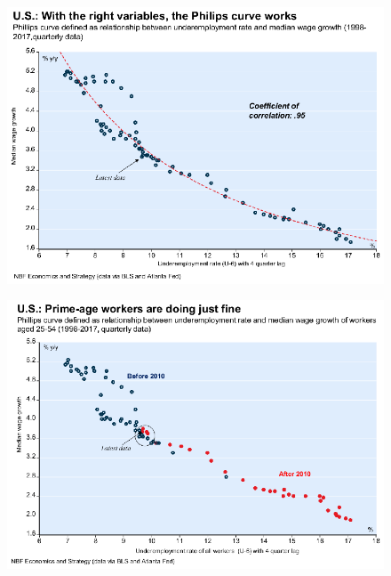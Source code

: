 \documentclass{beamer}
\begin{document}
\begin{frame}
  \begin{figure}
   \includegraphics[scale=.8]{pc5.eps}
  \end{figure}
\end{frame}

\begin{frame}
  \begin{figure}
   \includegraphics[scale=.8]{pc4.eps}
  \end{figure}
\end{frame}


\end{document}
